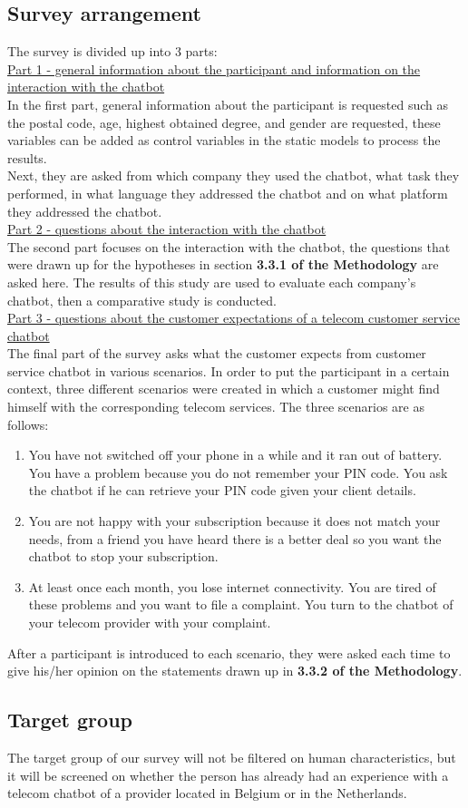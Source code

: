 \subsection{Survey arrangement}
The survey is divided up into 3 parts:\\
\break
\ul{Part 1 - general information about the participant and information on the interaction with the chatbot}\\
\break
In the first part, general information about the participant is requested such as the postal code, age, highest obtained degree, and gender are requested, these variables can be added as control variables in the static models to process the results.\\
\break
Next, they are asked from which company they used the chatbot, what task they performed, in what language they addressed the chatbot and on what platform they addressed the chatbot.\\
\break
\ul{Part 2 - questions about the interaction with the chatbot}\\
\break
The second part focuses on the interaction with the chatbot, the questions that were drawn up for the hypotheses in section \textbf{3.3.1 of the Methodology} are asked here. The results of this study are used to evaluate each company's chatbot, then a comparative study is conducted.\\
\break
\ul{Part 3 - questions about the customer expectations of a telecom customer service chatbot}\\
\break
The final part of the survey asks what the customer expects from customer service chatbot in various scenarios. In order to put the participant in a certain context, three different scenarios were created in which a customer might find himself with the corresponding telecom services. The three scenarios are as follows:
\begin{enumerate}
	\item You have not switched off your phone in a while and it  ran out of battery. You have a problem because you do not remember your PIN code. You ask the chatbot if he can retrieve your PIN code given your client details. 
	\item You are not happy with your subscription because it does not match your needs, from a friend you have heard there is a better deal so you want the chatbot to stop your subscription.
	\item At least once each month, you lose internet connectivity. You are tired of these problems and you want to file a complaint. You turn to the chatbot of your telecom provider with your complaint.
\end{enumerate}
After a participant is introduced to each scenario, they were asked each time to give his/her opinion on the statements drawn up in \textbf{3.3.2 of the Methodology}.

\subsection{Target group}
The target group of our survey will not be filtered on human characteristics, but it will be screened on whether the person has already had an experience with a telecom chatbot of a provider located in Belgium or in the Netherlands.
